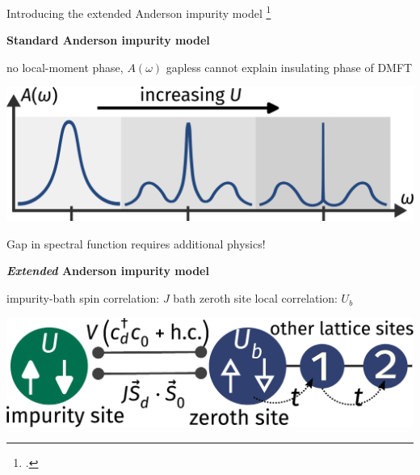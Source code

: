 \documentclass[8pt,aspectratio=169]{beamer}
\begin{document}
\begin{frame}{Introducing the extended Anderson impurity model}
\footcite{anderson_1961,anderson_1978,wilson1974,nozieres1974fermi,hrk_wilson_1980,andrei_1980,tsvelickKondoreview,hewson1993,costi_hewson_1990,costi2000,kuramoto1987,Cox1988}

\begin{minipage}{0.5\textwidth}
{\bf Standard Anderson impurity model\\}
\begin{itemize}
	\nitem no local-moment phase, \(A(\omega)\) gapless
	\nitem cannot explain insulating phase of DMFT
\end{itemize}
\end{minipage}
\hspace*{\fill}
\begin{minipage}{0.45\textwidth}
\includegraphics[width=\textwidth]{standard-siam.pdf}
\end{minipage}

\vspace*{20pt}

\alert{Gap in spectral function requires additional physics!}

\vspace*{20pt}

\begin{minipage}{0.5\textwidth}
\textbf{{\it Extended} Anderson impurity model\\}
\begin{itemize}
\nitem impurity-bath spin correlation: \(J\)
\nitem bath zeroth site local correlation: \(U_b\)
\end{itemize}
\end{minipage}
\hspace*{\fill}
\begin{minipage}{0.48\textwidth}
\includegraphics[width=\textwidth]{zeromode_bare.pdf}
\end{minipage}

\end{frame}
\end{document}
